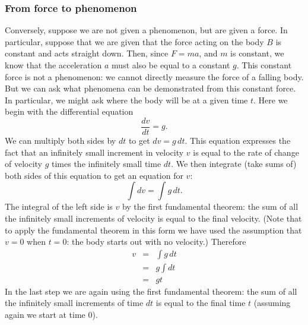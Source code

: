 \documentclass[polutonikogreek,english,twoside,openright]{article}
\begin{document}
\subsubsection*{From force to phenomenon}
Conversely, suppose we are not given a phenomenon, but are given a
force.  In particular, suppose that we are given that the force acting
on the body $B$ is constant and acts straight down.  Then, since
$F= ma$, and $m$ is constant, we know that the acceleration $a$ must
also be equal to a constant $g$.  This constant force is not a
phenomenon: we cannot directly measure the force of a falling body.
But we can ask what phenomena can be demonstrated from this constant
force.  In particular, we might ask where the body will be at a given
time $t$.  Here we begin with the differential equation
$$\frac{dv}{dt} = g.$$
We can multiply both sides by $dt$ to get $dv = g\,dt$.  This equation expresses the fact that an infinitely small increment in velocity $v$ is equal to the rate of change of velocity $g$ times the infinitely small time $dt$.
We then integrate (take sums of) both sides of this equation to get an
equation for $v$:
$$\int dv = \int \!g \,dt.$$
The integral of the left side is $v$
by the first fundamental theorem: the sum of all the infinitely small increments of velocity is equal to the final velocity.  (Note that to apply the fundamental
theorem in this form we have used the assumption that $v=0$ when
$t=0$: the body starts out with no velocity.)  Therefore
\begin{eqnarray*}
  v & = & \int \!g\,dt\\
    & = & g\int\!dt\\
    & = & gt 
\end{eqnarray*}
In the last step we are again using the first fundamental theorem: the sum of all the infinitely small increments of time $dt$ is equal to the final time $t$ (assuming again we start at time 0).
\end{document}
